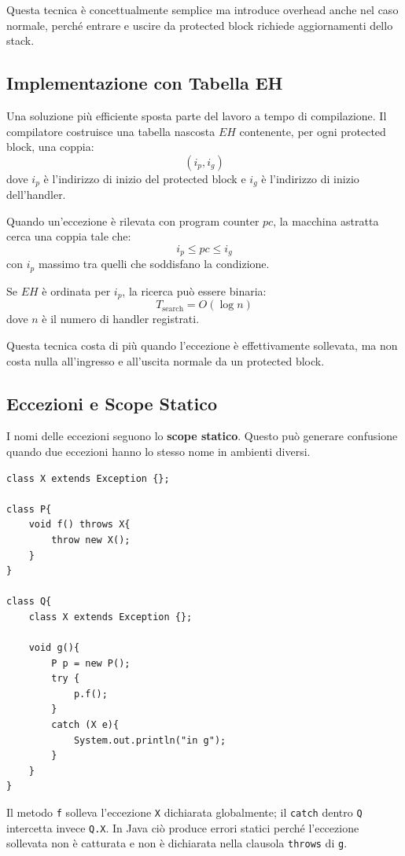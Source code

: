 \documentclass{article}
\begin{document}
Questa tecnica è concettualmente semplice ma introduce overhead anche nel caso normale, perché entrare e uscire da protected block richiede aggiornamenti dello stack.

\subsection{Implementazione con Tabella EH}

Una soluzione più efficiente sposta parte del lavoro a tempo di compilazione. Il compilatore costruisce una tabella nascosta $EH$ contenente, per ogni protected block, una coppia:
\[
(i_p, i_g)
\]
dove $i_p$ è l'indirizzo di inizio del protected block e $i_g$ è l'indirizzo di inizio dell'handler.

Quando un'eccezione è rilevata con program counter $pc$, la macchina astratta cerca una coppia tale che:
\[
i_p \leq pc \leq i_g
\]
con $i_p$ massimo tra quelli che soddisfano la condizione.

Se $EH$ è ordinata per $i_p$, la ricerca può essere binaria:
\[
T_{\mathrm{search}} = O(\log n)
\]
dove $n$ è il numero di handler registrati.

Questa tecnica costa di più quando l'eccezione è effettivamente sollevata, ma non costa nulla all'ingresso e all'uscita normale da un protected block.

\subsection{Eccezioni e Scope Statico}

I nomi delle eccezioni seguono lo \textbf{scope statico}. Questo può generare confusione quando due eccezioni hanno lo stesso nome in ambienti diversi.

\begin{lstlisting}
class X extends Exception {};

class P{
    void f() throws X{
        throw new X();
    }
}

class Q{
    class X extends Exception {};

    void g(){
        P p = new P();
        try {
            p.f();
        }
        catch (X e){
            System.out.println("in g");
        }
    }
}
\end{lstlisting}

Il metodo \texttt{f} solleva l'eccezione \texttt{X} dichiarata globalmente; il \texttt{catch} dentro \texttt{Q} intercetta invece \texttt{Q.X}. In Java ciò produce errori statici perché l'eccezione sollevata non è catturata e non è dichiarata nella clausola \texttt{throws} di \texttt{g}.
\end{document}
